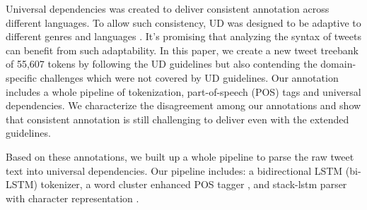 \documentclass[11pt,a4paper]{article}
\newcommand{\yjcomment}[1]{\textcolor{orange}{[$_\mathrm{L}^\mathrm{Y}$#1]}}
\newcommand{\nascomment}[1]{\textcolor{blue}{[#1 ---\textsc{nas}]}}
\begin{document}

Universal dependencies \citep[UD]{NIVRE16.348} was created to deliver
consistent annotation across different languages. To allow such
consistency, UD was designed to be adaptive to different genres and languages
\cite{guo-EtAl:2015:ACL-IJCNLP2,TACL892}. It's promising that analyzing
the syntax of tweets can benefit from such adaptability. In this paper,
we create a new tweet treebank of 55,607 tokens by following the UD
guidelines but also contending the domain-specific challenges which were not
covered by UD guidelines. Our annotation includes a whole pipeline of
tokenization, part-of-speech (POS) tags and universal dependencies.
We characterize the disagreement among our annotations and show that
consistent annotation is still challenging to deliver even with
the extended guidelines.


Based on these annotations, we built up a whole pipeline to parse the
raw tweet text into universal dependencies. Our pipeline includes: a
bidirectional LSTM (bi-LSTM) tokenizer, a word cluster enhanced POS
tagger \cite{owoputi-EtAl:2013:NAACL-HLT}, and stack-lstm parser
with character representation \cite{ballesteros-dyer-smith:2015:EMNLP}.
\end{document}
